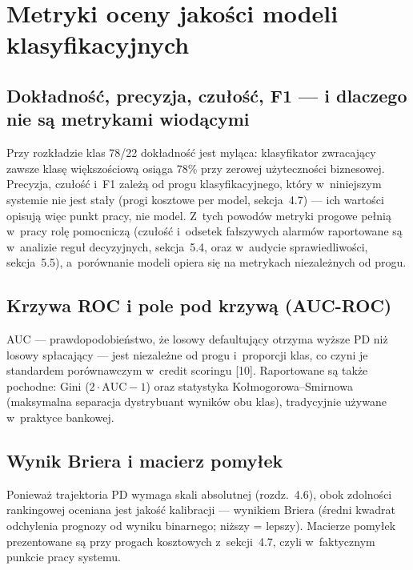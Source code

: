 
\section{Metryki oceny jakości modeli klasyfikacyjnych}

\subsection{Dokładność, precyzja, czułość, F1 --- i dlaczego nie są metrykami wiodącymi}

Przy rozkładzie klas 78/22 dokładność jest myląca: klasyfikator zwracający
zawsze klasę większościową osiąga 78\% przy zerowej użyteczności biznesowej.
Precyzja, czułość i~F1 zależą od progu klasyfikacyjnego, który w~niniejszym
systemie nie jest stały (progi kosztowe per model, sekcja~4.7) --- ich wartości
opisują więc punkt pracy, nie model. Z~tych powodów metryki progowe pełnią
w~pracy rolę pomocniczą (czułość i~odsetek fałszywych alarmów raportowane są
w~analizie reguł decyzyjnych, sekcja~5.4, oraz w~audycie sprawiedliwości,
sekcja~5.5), a~porównanie modeli opiera się na metrykach niezależnych od progu.

\subsection{Krzywa ROC i pole pod krzywą (AUC-ROC)}

AUC --- prawdopodobieństwo, że losowy defaultujący otrzyma wyższe PD niż losowy
spłacający --- jest niezależne od progu i~proporcji klas, co czyni je standardem
porównawczym w~credit scoringu [10]. Raportowane są także pochodne: Gini
($2\cdot\mathrm{AUC}-1$) oraz statystyka Kołmogorowa--Smirnowa (maksymalna
separacja dystrybuant wyników obu klas), tradycyjnie używane w~praktyce
bankowej.

\subsection{Wynik Briera i macierz pomyłek}

Ponieważ trajektoria PD wymaga skali absolutnej (rozdz.~4.6), obok zdolności
rankingowej oceniana jest jakość kalibracji --- wynikiem Briera (średni kwadrat
odchylenia prognozy od wyniku binarnego; niższy = lepszy). Macierze pomyłek
prezentowane są przy progach kosztowych z~sekcji~4.7, czyli w~faktycznym punkcie
pracy systemu.

